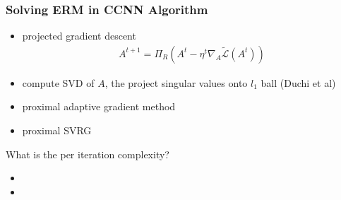 \documentclass[hyperref={colorlinks}]{beamer}
\begin{document}
\begin{frame}
	\frametitle{Solving ERM in CCNN Algorithm}
	\begin{itemize}
		\item projected gradient descent
		\begin{align*}
			A^{t+1}=\Pi_R(A^t-\eta^t\nabla_A\tilde{\mathcal{L}}(A^t))
		\end{align*}
		\item compute SVD of $A$, the project singular values onto $l_1$ ball (Duchi et al)
		\item proximal adaptive gradient method
		\item proximal SVRG
	\end{itemize}
	What is the per iteration complexity?
	\begin{itemize}
		\item
		\item
	\end{itemize}
\end{frame}
\end{document}
